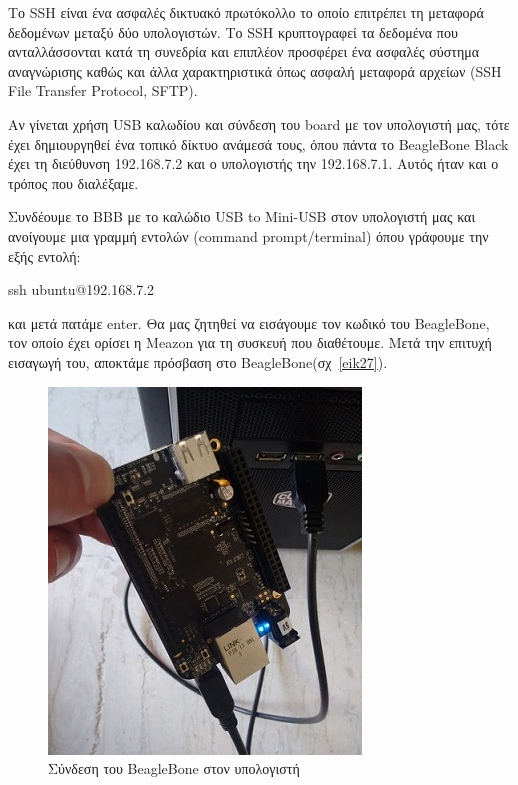\documentclass[12pt, a4paper, oneside]{report}
\begin{document}
Το SSH είναι ένα ασφαλές δικτυακό πρωτόκολλο το οποίο επιτρέπει τη μεταφορά δεδομένων μεταξύ δύο υπολογιστών. Το SSH κρυπτογραφεί τα δεδομένα που ανταλλάσσονται κατά τη συνεδρία και επιπλέον προσφέρει ένα ασφαλές σύστημα αναγνώρισης καθώς και άλλα χαρακτηριστικά όπως ασφαλή μεταφορά αρχείων (SSH File Transfer Protocol, SFTP).

Αν γίνεται χρήση USB καλωδίου και σύνδεση του board με τον υπολογιστή μας, τότε έχει δημιουργηθεί ένα τοπικό δίκτυο ανάμεσά τους, όπου πάντα το BeagleBone Black έχει τη διεύθυνση 192.168.7.2 και ο υπολογιστής την 192.168.7.1. Αυτός ήταν και ο τρόπος που διαλέξαμε.

Συνδέουμε το BBB με το καλώδιο USB to Mini-USB στον υπολογιστή μας και ανοίγουμε μια γραμμή εντολών (command prompt\slash terminal) όπου γράφουμε την εξής εντολή: 
\begin{code}
ssh ubuntu@192.168.7.2
\end{code} 
και μετά πατάμε enter. Θα μας ζητηθεί να εισάγουμε τον κωδικό του BeagleBone, τον οποίο έχει ορίσει η Meazon για τη συσκευή που διαθέτουμε. Mετά την επιτυχή εισαγωγή του, αποκτάμε πρόσβαση στο BeagleBone(σχ~\ref{eik27}).

\begin{figure}[!ht]
\centering
\includegraphics[scale=0.72]{eikona_26}
\caption{Σύνδεση του BeagleBone στον υπολογιστή}
\end{figure}
\end{document}
